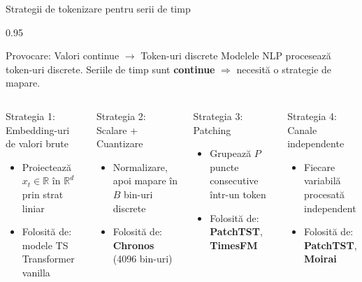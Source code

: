 \documentclass[9pt, aspectratio=169, t]{beamer}
\begin{document}
\begin{frame}{Strategii de tokenizare pentru serii de timp}
    \begin{cminipage}{0.95\textwidth}
    \vspace{-3mm}
    {\scriptsize
    \begin{block}{Provocare: Valori continue $\to$ Token-uri discrete}
        Modelele NLP procesează token-uri discrete. Seriile de timp sunt \textbf{continue} $\Rightarrow$ necesită o strategie de mapare.
    \end{block}
    \vspace{-2mm}
    \begin{columns}[T]
        \begin{exampleblock}{Strategia 1: Embedding-uri de valori brute}
            \begin{itemize}\setlength{\itemsep}{0pt}
                \item Proiectează $x_t \in \mathbb{R}$ în $\mathbb{R}^d$ prin strat liniar
                \item Folosită de: modele TS Transformer vanilla
            \end{itemize}
        \end{exampleblock}
        \vspace{-2mm}
        \begin{exampleblock}{Strategia 2: Scalare + Cuantizare}
            \begin{itemize}\setlength{\itemsep}{0pt}
                \item Normalizare, apoi mapare în $B$ bin-uri discrete
                \item Folosită de: \textbf{Chronos} (4096 bin-uri)
            \end{itemize}
        \end{exampleblock}

        \begin{exampleblock}{Strategia 3: Patching}
            \begin{itemize}\setlength{\itemsep}{0pt}
                \item Grupează $P$ puncte consecutive într-un token
                \item Folosită de: \textbf{PatchTST}, \textbf{TimesFM}
            \end{itemize}
        \end{exampleblock}
        \vspace{-2mm}
        \begin{exampleblock}{Strategia 4: Canale independente}
            \begin{itemize}\setlength{\itemsep}{0pt}
                \item Fiecare variabilă procesată independent
                \item Folosită de: \textbf{PatchTST}, \textbf{Moirai}
            \end{itemize}
        \end{exampleblock}
    \end{columns}
    }
    \end{cminipage}
\end{frame}
\end{document}
